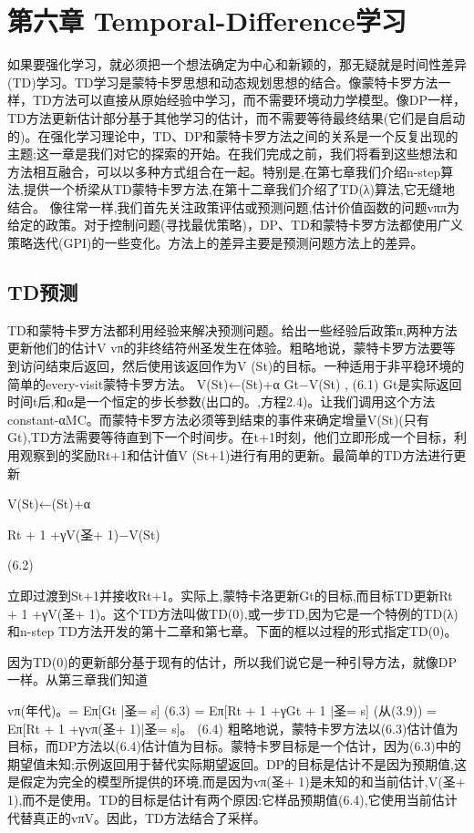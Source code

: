 
\chapter{第六章 Temporal-Difference学习}

\begin{summary}
	如果要强化学习，就必须把一个想法确定为中心和新颖的，那无疑就是时间性差异(TD)学习。TD学习是蒙特卡罗思想和动态规划思想的结合。像蒙特卡罗方法一样，TD方法可以直接从原始经验中学习，而不需要环境动力学模型。像DP一样，TD方法更新估计部分基于其他学习的估计，而不需要等待最终结果(它们是自启动的)。在强化学习理论中，TD、DP和蒙特卡罗方法之间的关系是一个反复出现的主题;这一章是我们对它的探索的开始。在我们完成之前，我们将看到这些想法和方法相互融合，可以以多种方式组合在一起。特别是,在第七章我们介绍n-step算法,提供一个桥梁从TD蒙特卡罗方法,在第十二章我们介绍了TD(λ)算法,它无缝地结合。
	像往常一样,我们首先关注政策评估或预测问题,估计价值函数的问题vππ为给定的政策。对于控制问题(寻找最优策略)，DP、TD和蒙特卡罗方法都使用广义策略迭代(GPI)的一些变化。方法上的差异主要是预测问题方法上的差异。
\end{summary}

\section{TD预测}
TD和蒙特卡罗方法都利用经验来解决预测问题。给出一些经验后政策π,两种方法更新他们的估计V vπ的非终结符州圣发生在体验。粗略地说，蒙特卡罗方法要等到访问结束后返回，然后使用该返回作为V (St)的目标。一种适用于非平稳环境的简单的every-visit蒙特卡罗方法。
V(St)←(St)+α
Gt−V(St)
, 					(6.1)
Gt是实际返回时间t后,和α是一个恒定的步长参数(出口的。,方程2.4)。让我们调用这个方法constant-αMC。而蒙特卡罗方法必须等到结束的事件来确定增量V(St)(只有Gt),TD方法需要等待直到下一个时间步。在t+1时刻，他们立即形成一个目标，利用观察到的奖励Rt+1和估计值V (St+1)进行有用的更新。最简单的TD方法进行更新

V(St)←(St)+α

Rt + 1 +γV(圣+ 1)−V(St)

(6.2)

立即过渡到St+1并接收Rt+1。实际上,蒙特卡洛更新Gt的目标,而目标TD更新Rt + 1 +γV(圣+ 1)。这个TD方法叫做TD(0),或一步TD,因为它是一个特例的TD(λ)和n-step TD方法开发的第十二章和第七章。下面的框以过程的形式指定TD(0)。
 

因为TD(0)的更新部分基于现有的估计，所以我们说它是一种引导方法，就像DP一样。从第三章我们知道

vπ(年代)。= Eπ[Gt |圣= s] 					(6.3)
= Eπ[Rt + 1 +γGt + 1 |圣= s] 					(从(3.9))
= Eπ[Rt + 1 +γvπ(圣+ 1)|圣= s]。 					(6.4)
粗略地说，蒙特卡罗方法以(6.3)估计值为目标，而DP方法以(6.4)估计值为目标。蒙特卡罗目标是一个估计，因为(6.3)中的期望值未知;示例返回用于替代实际期望返回。DP的目标是估计不是因为预期值,这是假定为完全的模型所提供的环境,而是因为vπ(圣+ 1)是未知的和当前估计,V(圣+ 1),而不是使用。TD的目标是估计有两个原因:它样品预期值(6.4),它使用当前估计代替真正的vπV。因此，TD方法结合了采样。

